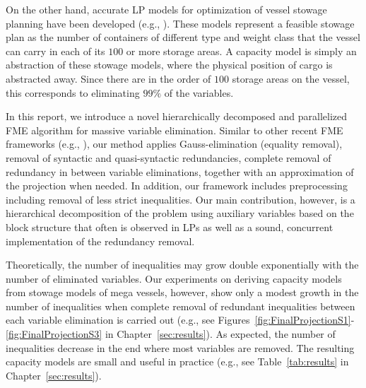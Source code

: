 On the other hand, accurate LP models for optimization of vessel stowage planning have been developed (e.g., {\cite{pacino11,pacino12,AlbertosThesis}}). These models represent a feasible stowage plan as the number of containers of different type and weight class that the vessel can carry in each of its $100$ or more storage areas. A capacity model is simply an abstraction of these stowage models, where the physical position of cargo is abstracted away. Since there are in the order of $100$ storage areas on the vessel, this corresponds to eliminating $99\%$ of the variables. 

In this report, we introduce a novel hierarchically decomposed and parallelized FME algorithm for massive variable elimination. Similar to other recent FME frameworks (e.g., \cite{simon05,lukatskii08,shapot12}), our method applies Gauss\--eli\-mi\-na\-tion (equality removal), removal of syntactic and quasi-syntactic redundancies, complete removal of redundancy in between variable eliminations, together with an approximation of the projection when needed. In addition, our framework includes preprocessing including removal of less strict inequalities. 
Our main contribution, however, is a hierarchical decomposition of the problem using auxiliary variables based on the block structure that often is observed in LPs \cite{williams} as well as a sound, concurrent implementation of the redundancy removal. 

Theoretically, the number of inequalities may grow double exponentially with the number of eliminated variables. Our experiments on deriving capacity models from stowage models of mega vessels, however, show only a modest growth in the number of inequalities  when complete removal of redundant inequalities between each variable elimination is carried out (e.g., see Figures~\ref{fig:FinalProjectionS1}-\ref{fig:FinalProjectionS3} in Chapter~\ref{sec:results}). As expected, the number of inequalities decrease in the end where most variables are removed. The resulting capacity models are small and useful in practice (e.g., see Table~\ref{tab:results} in Chapter~\ref{sec:results}). 

